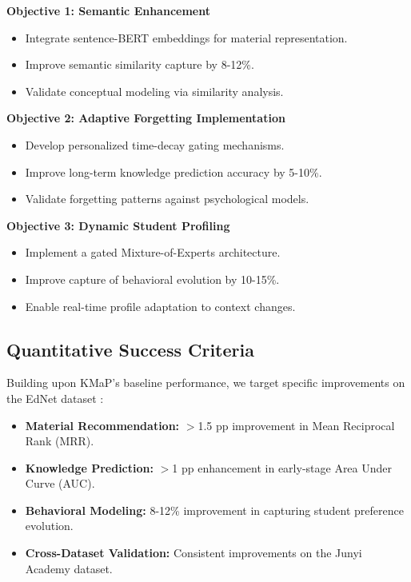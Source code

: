 \documentclass[project-plan]{report-template}
\begin{document}
\textbf{Objective 1: Semantic Enhancement}
\begin{itemize}
    \item Integrate sentence-BERT embeddings for material representation.
    \item Improve semantic similarity capture by 8-12\%.
    \item Validate conceptual modeling via similarity analysis.
\end{itemize}

\textbf{Objective 2: Adaptive Forgetting Implementation}
\begin{itemize}
    \item Develop personalized time-decay gating mechanisms.
    \item Improve long-term knowledge prediction accuracy by 5-10\%.
    \item Validate forgetting patterns against psychological models.
\end{itemize}

\textbf{Objective 3: Dynamic Student Profiling}
\begin{itemize}
    \item Implement a gated Mixture-of-Experts architecture.
    \item Improve capture of behavioral evolution by 10-15\%.
    \item Enable real-time profile adaptation to context changes.
\end{itemize}

\subsection{Quantitative Success Criteria}
Building upon KMaP's baseline performance, we target specific improvements on the EdNet dataset \cite{choi2020ednet}:

\begin{itemize}
    \item \textbf{Material Recommendation:} $>$1.5 pp improvement in Mean Reciprocal Rank (MRR).
    \item \textbf{Knowledge Prediction:} $>$1 pp enhancement in early-stage Area Under Curve (AUC).
    \item \textbf{Behavioral Modeling:} 8-12\% improvement in capturing student preference evolution.
    \item \textbf{Cross-Dataset Validation:} Consistent improvements on the Junyi Academy dataset.
\end{itemize}
\end{document}
